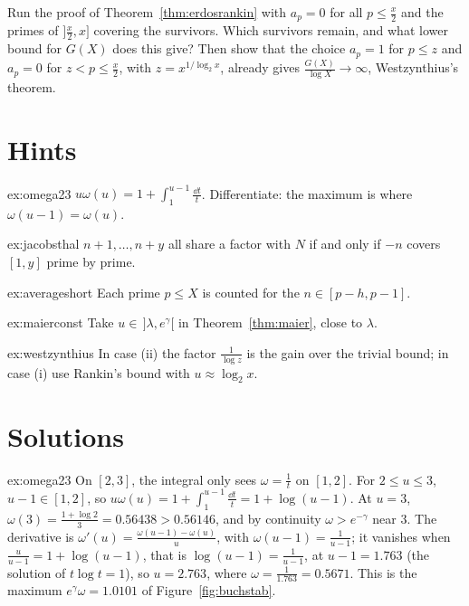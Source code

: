 \begin{exercise}[$\star\star$]\label{ex:westzynthius}
Run the proof of Theorem~\ref{thm:erdosrankin} with $a_p=0$ for all $p\le\frac x2$ and the primes of $]\frac x2,x]$ covering the survivors. Which survivors remain, and what lower bound for $G(X)$ does this give? Then show that the choice $a_p=1$ for $p\le z$ and $a_p=0$ for $z<p\le\frac x2$, with $z=x^{1/\log_2x}$, already gives $\frac{G(X)}{\log X}\to\infty$, Westzynthius's theorem.
\end{exercise}

\section{Hints}

\begin{hint}{ex:omega23}
$u\omega(u)=1+\int_1^{u-1}\frac{\dd t}t$. Differentiate: the maximum is where $\omega(u-1)=\omega(u)$.
\end{hint}
\begin{hint}{ex:jacobsthal}
$n+1,\dots,n+y$ all share a factor with $N$ if and only if $-n$ covers $[1,y]$ prime by prime.
\end{hint}
\begin{hint}{ex:averageshort}
Each prime $p\le X$ is counted for the $n\in[p-h,p-1]$.
\end{hint}
\begin{hint}{ex:maierconst}
Take $u\in\,]\lambda,e^\gamma[$ in Theorem~\ref{thm:maier}, close to $\lambda$.
\end{hint}
\begin{hint}{ex:westzynthius}
In case (ii) the factor $\frac1{\log z}$ is the gain over the trivial bound; in case (i) use Rankin's bound with $u\approx\log_2x$.
\end{hint}

\section{Solutions}

\begin{solution}{ex:omega23}
\idea On $[2,3]$, the integral only sees $\omega=\frac1t$ on $[1,2]$.
\writeup For $2\le u\le3$, $u-1\in[1,2]$, so $u\omega(u)=1+\int_1^{u-1}\frac{\dd t}t=1+\log(u-1)$. At $u=3$, $\omega(3)=\frac{1+\log2}3=0.56438>0.56146$, and by continuity $\omega>e^{-\gamma}$ near $3$. The derivative is $\omega'(u)=\frac{\omega(u-1)-\omega(u)}u$, with $\omega(u-1)=\frac1{u-1}$; it vanishes when $\frac u{u-1}=1+\log(u-1)$, that is $\log(u-1)=\frac1{u-1}$, at $u-1=1.763$ (the solution of $t\log t=1$), so $u=2.763$, where $\omega=\frac1{1.763}=0.5671$. This is the maximum $e^\gamma\omega=1.0101$ of Figure~\ref{fig:buchstab}.
\end{solution}

